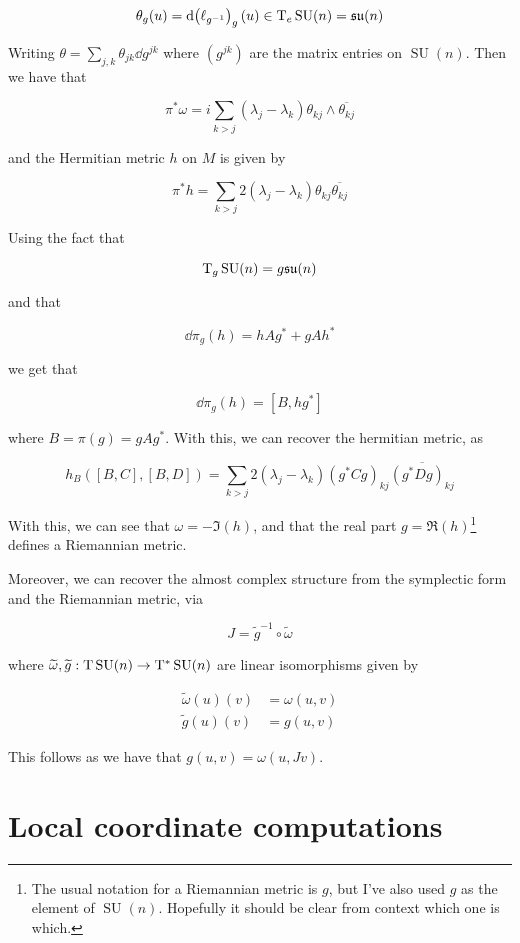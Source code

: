 \documentclass{article}
\DeclareMathOperator{\SU}{SU}
\newcommand{\su}{\mathfrak{su}}
\renewcommand{\tilde}{\widetilde}
\begin{document}
\[\theta_g(u) = \dd (\ell_{g^{-1}})_g(u) \in \TT_e\SU(n) = \su(n)\]

Writing \(\theta = \sum_{j, k}\theta_{jk}\dd g^{jk}\) where \((g^{jk})\) are the matrix entries on \(\SU(n)\). Then we have that

\[\pi^*\omega = i \sum_{k > j}(\lambda_j - \lambda_k)\theta_{kj}\wedge \overline{\theta_{kj}}\]

and the Hermitian metric \(h\) on \( M\) is given by

\[\pi^*h = \sum_{k > j}2(\lambda_j - \lambda_k)\theta_{kj}\overline{\theta_{kj}}\]

Using the fact that

\[\TT_g\SU(n) = g\su(n)\]

and that

\[\dd\pi_g(h) = hAg^* + gAh^*\]

we get that

\[\dd\pi_g(h) = [B, hg^*]\]

where \(B = \pi(g) = gAg^*\). With this, we can recover the hermitian metric, as

\[h_B([B, C], [B, D]) = \sum_{k > j}2(\lambda_j - \lambda_k)(g^* Cg)_{kj}\overline{(g^* Dg)_{kj}}\]

With this, we can see that \(\omega = -\Im(h)\), and that the real part \(g = \Re(h)\)\footnote{The usual notation for a Riemannian metric is \(g\), but I've also used \(g\) as the element of \(\SU(n)\). Hopefully it should be clear from context which one is which.} defines a Riemannian metric.

Moreover, we can recover the almost complex structure from the symplectic form and the Riemannian metric, via

\[J = \tilde g^{-1} \circ \tilde\omega\]

where \(\tilde\omega, \tilde g : \TT \SU(n) \to \TT^*\SU(n)\) are linear isomorphisms given by

\begin{align*}
    \tilde \omega(u)(v) &= \omega(u, v) \\
    \tilde g(u)(v) &= g(u, v)
\end{align*}

This follows as we have that \(g(u, v) = \omega(u, Jv)\).

\appendix

\section{Local coordinate computations}
\end{document}
